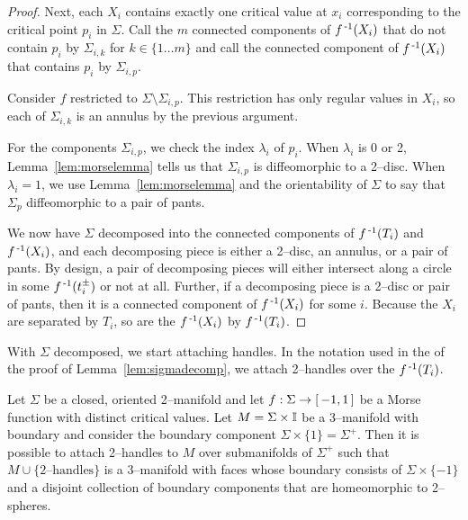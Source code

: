 \begin{proof}
	Next, each $X_i$ contains exactly one critical value at $x_i$ corresponding to the critical point $p_i$ in $\Sigma$.
	Call the $m$ connected components of $f^{\,\text{-}1}(X_i)$ that do not contain $p_i$ by $\Sigma_{i,k}$ for $k\in\{1\dots m\}$ and call the connected component of $f^{\,\text{-}1}(X_i)$ that contains $p_i$ by $\Sigma_{i,p}$.
	
	Consider $f$ restricted to $\Sigma\setminus\Sigma_{i,p}$.
	This restriction has only regular values in $X_i$, so each of $\Sigma_{i,k}$ is an annulus by the previous argument.
	
	For the components $\Sigma_{i,p}$, we check the index $\lambda_i$ of $p_i$.
	When $\lambda_i$ is 0 or 2, Lemma~\ref{lem:morselemma} tells us that $\Sigma_{i,p}$ is diffeomorphic to a 2--disc.
	When $\lambda_i=1$, we use Lemma~\ref{lem:morselemma} and the orientability of $\Sigma$ to say that $\Sigma_p$ diffeomorphic to a pair of pants.
	
	
	We now have $\Sigma$ decomposed into the connected components of $f^{\,\text{-}1}(T_i)$ and $f^{\,\text{-}1}(X_i)$, and each decomposing piece is either a 2--disc, an annulus, or a pair of pants.
	By design, a pair of decomposing pieces will either intersect along a circle in some $f^{\,\text{-}1}(t_i^\pm)$ or not at all.
	Further, if a decomposing piece is a 2--disc or pair of pants, then it is a connected component of $f^{\,\text{-}1}(X_i)$ for some $i$.
	Because the $X_i$ are separated by $T_i$, so are the $f^{\,\text{-}1}(X_i)$ by $f^{\,\text{-}1}(T_i)$.	
\end{proof}

With $\Sigma$ decomposed, we start attaching handles.
In the notation used in the of the proof of Lemma~\ref{lem:sigmadecomp}, we attach 2--handles over the $f^{\,\text{-}1}(T_i)$.

\begin{lem}
	\label{lem:sigma2handles}
	Let $\Sigma$ be a closed, oriented 2--manifold and let $f:\Sigma\to[\,-1,1\,]$ be a Morse function with distinct critical values.
	Let $M=\Sigma\times\mathbb{I}$ be a 3--manifold with boundary and consider the boundary component $\Sigma\times\{1\}=\Sigma^+$.
	Then it is possible to attach 2--handles to $M$ over submanifolds of $\Sigma^+$	such that $M\cup\{\textrm{2--handles}\}$ is a 3--manifold with faces whose boundary consists of $\Sigma\times\{-1\}$ and a disjoint collection of boundary components that are homeomorphic to 2--spheres.
\end{lem}

